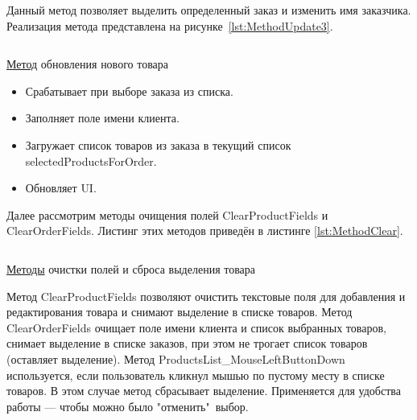 \documentclass[12pt]{article}
\newcommand{\colorGIT}[1]{\textcolor{CtpLavender}{#1}}
\renewcommand{\texttt}[1]{{\small\ttfamily #1}}
\newenvironment{code}{\captionsetup{type=listing}}{}
\numberwithin{listing}{section}
\numberwithin{figure}{section}
\begin{document}
Данный метод позволяет выделить определенный заказ и изменить имя заказчика. Реализация метода представлена на рисунке~\ref{lst:MethodUpdate3}.

\begin{code}
	\inputminted[firstline=379, lastline=390]{csharp}{../../3lab/StoreManager/MainWindow.xaml.cs}
	\caption{\colorGIT{\href{https://github.com/WebMasterIT/Csharp_Labs/blob/ec375afd16c0647b337cf3d8a79c8bef904fc1be/3lab/StoreManager/MainWindow.xaml.cs\#L379-L390}{Метод}} обновления нового товара }
	\label{lst:MethodUpdate3}
\end{code}

\begin{itemize}
	\item Срабатывает при выборе заказа из списка.
	\item Заполняет поле имени клиента.
	\item Загружает список товаров из заказа в текущий список \texttt{selectedProductsForOrder}.
	\item Обновляет \texttt{UI}.
\end{itemize}

{}


Далее рассмотрим методы очищения полей \texttt{ClearProductFields} и \texttt{ClearOrderFields}. Листинг этих методов приведён в листинге \ref{lst:MethodClear}.

\begin{code}
	\inputminted[firstline=392, lastline=432]{csharp}{../../3lab/StoreManager/MainWindow.xaml.cs}
	\caption{\colorGIT{\href{https://github.com/WebMasterIT/Csharp_Labs/blob/ec375afd16c0647b337cf3d8a79c8bef904fc1be/3lab/StoreManager/MainWindow.xaml.cs\#L392-L432}{Методы}} очистки полей и сброса выделения товара}
	\label{lst:MethodClear}
\end{code}

Метод \texttt{ClearProductFields} позволяют очистить текстовые поля для добавления и редактирования товара и снимают выделение в списке товаров. Метод \texttt{ClearOrderFields} очищает поле имени клиента и список выбранных товаров, снимает выделение в списке заказов, при этом не трогает список товаров (оставляет выделение). Метод \texttt{ProductsList\_MouseLeftButtonDown} используется, если пользователь кликнул мышью по пустому месту в списке товаров. В этом случае метод сбрасывает выделение. Применяется для удобства работы — чтобы можно было "отменить"\ выбор.
\end{document}
